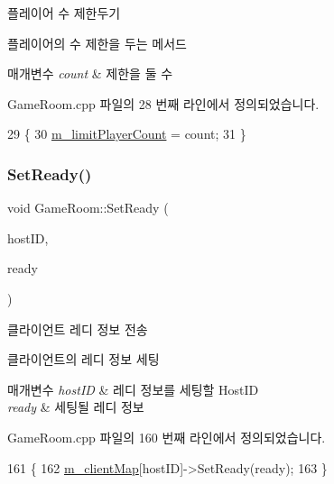플레이어 수 제한두기 

플레이어의 수 제한을 두는 메서드


\begin{DoxyParams}{매개변수}
{\em count} & 제한을 둘 수 \\
\hline
\end{DoxyParams}


Game\+Room.\+cpp 파일의 28 번째 라인에서 정의되었습니다.


\begin{DoxyCode}
29 \{
30     \hyperlink{class_game_room_ae03c39da189ee9097af8ee4cde8ba373}{m\_limitPlayerCount} = count;
31 \}
\end{DoxyCode}
\mbox{\label{class_game_room_ae1d0122ec800084f45041131fbb41da7}} 
\subsubsection{\texorpdfstring{Set\+Ready()}{SetReady()}}
{\footnotesize\ttfamily void Game\+Room\+::\+Set\+Ready (\begin{DoxyParamCaption}\item[{Host\+ID}]{host\+ID,  }\item[{bool}]{ready }\end{DoxyParamCaption})}



클라이언트 레디 정보 전송 

클라이언트의 레디 정보 세팅


\begin{DoxyParams}{매개변수}
{\em host\+ID} & 레디 정보를 세팅할 Host\+ID \\
\hline
{\em ready} & 세팅될 레디 정보 \\
\hline
\end{DoxyParams}


Game\+Room.\+cpp 파일의 160 번째 라인에서 정의되었습니다.


\begin{DoxyCode}
161 \{
162     \hyperlink{class_game_room_afc202a511605453216f7dd870ff96c5c}{m\_clientMap}[hostID]->SetReady(ready);
163 \}
\end{DoxyCode}
\mbox{\label{class_game_room_a9c5ecd98749f146054d1797084591c28}} 
